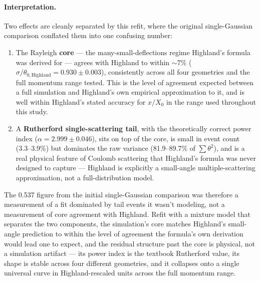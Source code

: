 \documentclass[a4paper,11pt]{article}
\begin{document}
\paragraph{Interpretation.} Two effects are cleanly separated by this refit, where the original single-Gaussian comparison conflated them into one confusing number:
\begin{enumerate}
\item The Rayleigh \textbf{core} --- the many-small-deflections regime Highland's formula was derived for --- agrees with Highland to within $\sim$7\% ($\sigma/\theta_{0,\text{Highland}} = 0.930 \pm 0.003$), consistently across all four geometries and the full momentum range tested. This is the level of agreement expected between a full simulation and Highland's own empirical approximation to it, and is well within Highland's stated accuracy for $x/X_0$ in the range used throughout this study.
\item A \textbf{Rutherford single-scattering tail}, with the theoretically correct power index ($\alpha = 2.999 \pm 0.046$), sits on top of the core, is small in event count (3.3--3.9\%) but dominates the raw variance (81.9--89.7\% of $\sum\theta^2$), and is a real physical feature of Coulomb scattering that Highland's formula was never designed to capture --- Highland is explicitly a small-angle multiple-scattering approximation, not a full-distribution model.
\end{enumerate}

The 0.537 figure from the initial single-Gaussian comparison was therefore a measurement of a fit dominated by tail events it wasn't modeling, not a measurement of core agreement with Highland. Refit with a mixture model that separates the two components, the simulation's core matches Highland's small-angle prediction to within the level of agreement the formula's own derivation would lead one to expect, and the residual structure past the core is physical, not a simulation artifact --- its power index is the textbook Rutherford value, its shape is stable across four different geometries, and it collapses onto a single universal curve in Highland-rescaled units across the full momentum range.
\end{document}
